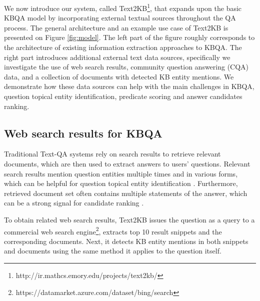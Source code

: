 We now introduce our system, called Text2KB\footnote{http://ir.mathcs.emory.edu/projects/text2kb/}, that expands upon the basic KBQA model by incorporating external textual sources throughout the QA process. The general architecture and an example use case of Text2KB is presented on Figure \ref{fig:model}. 
The left part of the figure roughly corresponds to the architecture of existing information extraction approaches to KBQA.
The right part introduces additional external text data sources, specifically
we investigate the use of web search results, community question answering (CQA) data, and a collection of documents with detected KB entity mentions.
We demonstrate how these data sources can help with the main challenges in KBQA, \ie question topical entity identification, predicate scoring and answer candidates ranking.


\subsection{Web search results for KBQA}
\label{section:method:web}

Traditional Text-QA systems rely on search results to retrieve relevant documents, which are then used to extract answers to users' questions.
Relevant search results mention question entities multiple times and in various forms, which can be helpful for question topical entity identification \cite{SMAPH_ERD:2014}.
Furthermore, retrieved document set often contains multiple statements of the answer, which can be a strong signal for candidate ranking \cite{Lin:2007:EPU:1229179.1229180}.

To obtain related web search results, Text2KB issues the question as a query to a commercial web search engine\footnote{https://datamarket.azure.com/dataset/bing/search}, extracts top 10 result snippets and the corresponding documents.
Next, it detects KB entity mentions in both snippets and documents using the same method it applies to the question itself.

